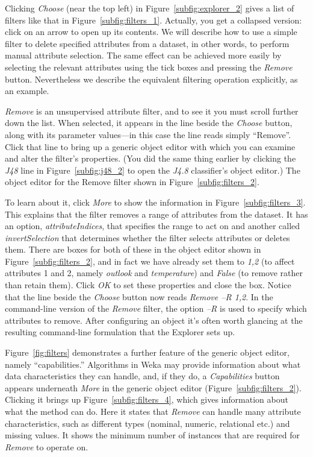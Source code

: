 Clicking \textit{Choose} (near the top left) in
Figure~\ref{subfig:explorer_2} gives a list of filters like that in
Figure~\ref{subfig:filters_1}. Actually, you get a collapsed version:
click on an arrow to open up its contents. We will describe how to use
a simple filter to delete specified attributes from a dataset, in
other words, to perform manual attribute selection. The same effect
can be achieved more easily by selecting the relevant attributes using
the tick boxes and pressing the \textit{Remove} button. Nevertheless
we describe the equivalent filtering operation explicitly, as an
example.

\textit{Remove} is an unsupervised attribute filter, and to see it you
must scroll further down the list. When selected, it appears in the
line beside the \textit{Choose} button, along with its parameter
values---in this case the line reads simply ``Remove''. Click that line
to bring up a generic object editor with which you can examine and
alter the filter’s properties. (You did the same thing earlier by
clicking the \textit{J48} line in Figure~\ref{subfig:j48_2} to open
the \textit{J4.8} classifier’s object editor.) The object editor for
the Remove filter shown in Figure~\ref{subfig:filters_2}.

To learn about it, click \textit{More} to show the information in
Figure~\ref{subfig:filters_3}. This explains that the filter removes a
range of attributes from the dataset. It has an option,
\textit{attributeIndices}, that specifies the range to act on and
another called \textit{invertSelection} that determines whether the
filter selects attributes or deletes them. There are boxes for both of
these in the object editor shown in Figure~\ref{subfig:filters_2}, and
in fact we have already set them to \textit{1,2} (to affect attributes
1 and 2, namely \textit{outlook} and \textit{temperature}) and
\textit{False} (to remove rather than retain them). Click \textit{OK}
to set these properties and close the box. Notice that the line beside
the \textit{Choose} button now reads \textit{Remove --R 1,2}. In the
command-line version of the \textit{Remove} filter, the option
\textit{--R} is used to specify which attributes to remove. After
configuring an object it’s often worth glancing at the resulting
command-line formulation that the Explorer sets up.

Figure~\ref{fig:filters} demonstrates a further feature of the generic
object editor, namely ``capabilities.'' Algorithms in Weka may provide
information about what data characteristics they can handle, and, if
they do, a \textit{Capabilities} button appears underneath
\textit{More} in the generic object editor
(Figure~\ref{subfig:filters_2}). Clicking it brings up
Figure~\ref{subfig:filters_4}, which gives information about what the
method can do. Here it states that \textit{Remove} can handle many
attribute characteristics, such as different types (nominal, numeric,
relational etc.) and missing values. It shows the minimum number of
instances that are required for \textit{Remove} to operate on.

